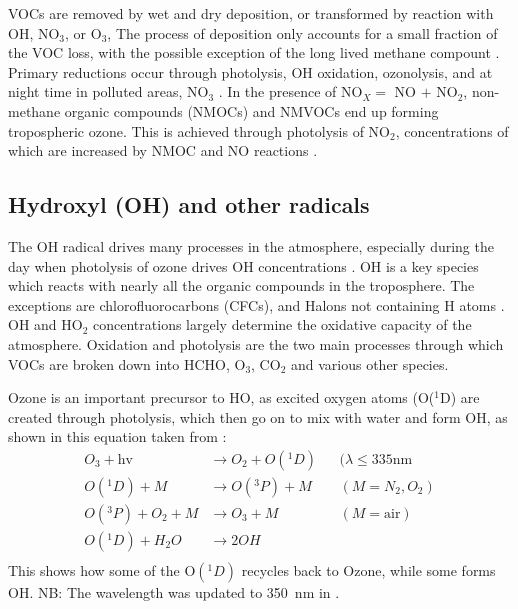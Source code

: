     VOCs are removed by wet and dry deposition, or transformed by reaction with OH, NO$_3$, or O$_3$,
    The process of deposition only accounts for a small fraction of the VOC loss, with the possible exception of the long lived methane compount \citep{AtkinsonArey2003}.
    Primary reductions occur through photolysis, OH oxidation, ozonolysis, and at night time in polluted areas, NO$_3$ \citep{AtkinsonArey2003, Brown2009}.
    In the presence of NO$_X = $ NO $+$ NO$_2$, non-methane organic compounds (NMOCs) and NMVOCs end up forming tropospheric ozone.
    This is achieved through photolysis of NO$_2$, concentrations of which are increased by NMOC and NO reactions \citep{AtkinsonArey2003}.
  
  \subsection{Hydroxyl (OH) and other radicals}
    \label{ch_LitRev:sec:RadicalFormation}
    
    The OH radical drives many processes in the atmosphere, especially during the day when photolysis of ozone drives OH concentrations \citep{Atkinson2000}.    
    OH is a key species which reacts with nearly all the organic compounds in the troposphere.
    The exceptions are chlorofluorocarbons (CFCs), and Halons not containing H atoms \citep{Atkinson2000}.
    OH and HO$_2$ concentrations largely determine the oxidative capacity of the atmosphere.
    Oxidation and photolysis are the two main processes through which VOCs are broken down into HCHO, O$_3$, CO$_2$ and various other species.
    
    Ozone is an important precursor to HO, as excited oxygen atoms (O(${}^1$D) are created through photolysis, which then go on to mix with water and form OH, as shown in this equation taken from \citet{Atkinson2000}:
    \begin{align*}
      O_3 + \text{hv}         & \to  O_2 + O({}^1D)   && (\lambda \le 335 \text{nm} \\%
      O({}^1D) + M            & \to  O({}^3P) + M     && (M=N_2, O_2)               \\%
      O({}^3P) + O_2 + M      & \to  O_3 + M          && (M=\text{air})             \\%
      O({}^1D) + H_2O         & \to  2OH              &&                            \\%
    \end{align*}
    This shows how some of the O$({}^1D)$ recycles back to Ozone, while some forms OH.
    NB: The wavelength was updated to 350~nm in \citet{AtkinsonArey2003}.
    
